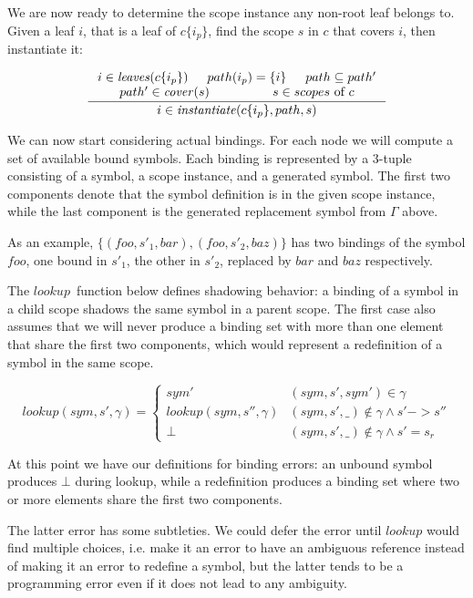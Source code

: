 \documentclass{kththesis}
\begin{document}
We are now ready to determine the scope instance any non-root leaf belongs to. Given a leaf $i$, that is a leaf of $c\{i_p\}$, find the scope $s$ in $c$ that covers $i$, then instantiate it:

$$
\inference{
  i \in \leaves(c\{i_p\}) &
  path(i_p) = \{i\} &
  path \subseteq path' \\
  path' \in \cover(s) &
  s \in scopes \text{ of } c
}{i \in \instantiate(c\{i_p\}, path, s)}
$$

We can now start considering actual bindings. For each node we will compute a set of available bound symbols. Each binding is represented by a 3-tuple consisting of a symbol, a scope instance, and a generated symbol. The first two components denote that the symbol definition is in the given scope instance, while the last component is the generated replacement symbol from $\Gamma$ above.

As an example, $\{(\mathit{foo}, s'_1, \mathit{bar}), (\mathit{foo}, s'_2, \mathit{baz})\}$ has two bindings of the symbol $\mathit{foo}$, one bound in $s'_1$, the other in $s'_2$, replaced by $\mathit{bar}$ and $\mathit{baz}$ respectively.

\newcommand{\lookup}{\ensuremath{\mathit{lookup}}}

The \lookup\ function below defines shadowing behavior: a binding of a symbol in a child scope shadows the same symbol in a parent scope. The first case also assumes that we will never produce a binding set with more than one element that share the first two components, which would represent a redefinition of a symbol in the same scope.

$$
\lookup(sym, s', \gamma) =
\begin{cases}
\mathit{sym}' & (sym, s', \mathit{sym}') \in \gamma \\
\lookup(sym, s'', \gamma) & (sym, s', \_) \not\in \gamma \land s' -> s'' \\
\bot & (sym, s', \_) \not\in \gamma \land s' = s_r
\end{cases}
$$

At this point we have our definitions for binding errors: an unbound symbol produces $\bot$ during lookup, while a redefinition produces a binding set where two or more elements share the first two components.

The latter error has some subtleties. We could defer the error until $\lookup$ would find multiple choices, i.e. make it an error to have an ambiguous reference instead of making it an error to redefine a symbol, but the latter tends to be a programming error even if it does not lead to any ambiguity.
\end{document}
